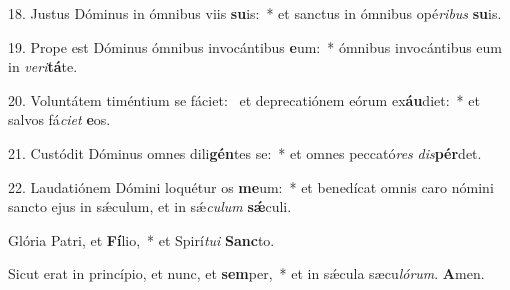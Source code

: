 \begin{latinenglishsection}
{	18. Justus Dóminus in ómnibus viis \textbf{su}is:~*
		et sanctus in ómnibus opé\textit{ri}\textit{bus} \textbf{su}is.
	
	19. Prope est Dóminus ómnibus invocántibus \textbf{e}um:~*
		ómnibus invocántibus eum in \textit{ve}\textit{ri}\textbf{tá}te.
	
	20. Voluntátem timéntium se fáciet:~\GreDagger
		et deprecatiónem eórum ex\textbf{áu}diet:~*
		et salvos fá\textit{ci}\textit{et} \textbf{e}os.
	
	21. Custódit Dóminus omnes dili\textbf{gén}tes se:~*
		et omnes peccató\textit{res} \textit{dis}\textbf{pér}det.
	
	22. Laudatiónem Dómini loquétur os \textbf{me}um:~*
		et benedícat omnis caro nómini sancto ejus in s\'{\ae}culum, et in s\'{\ae}\textit{cu}\textit{lum} \textbf{s\'{\ae}}culi.
	
	Glória Patri, et \textbf{Fí}lio,~*
		et Spirí\textit{tu}\textit{i} \textbf{Sanc}to.
	
	Sicut erat in princípio, et nunc, et \textbf{sem}per,~*
		et in s\'{\ae}cula sæcu\textit{ló}\textit{rum}. \textbf{A}men.

}{
	
}

\end{latinenglishsection}